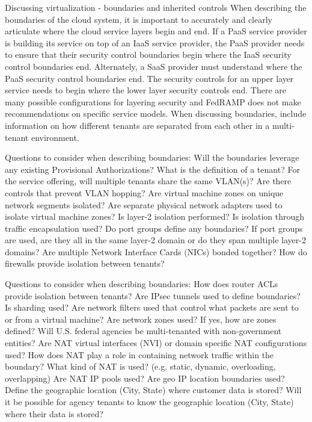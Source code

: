 \documentclass[../main.tex]{subfiles}
\begin{document}
Discussing virtualization - boundaries and inherited controls
When describing the boundaries of the cloud system, it is important to accurately and clearly articulate where the cloud service layers begin and end.
If a PaaS service provider is building its service on top of an IaaS service provider, the PaaS provider needs to ensure that their security control boundaries begin where the IaaS security control boundaries end. Alternately, a SaaS provider must understand where the PaaS security control boundaries end.
The security controls for an upper layer service needs to begin where the lower layer security controls end.
There are many possible configurations for layering security and FedRAMP does not make recommendations on specific service models.
When discussing boundaries, include information on how different tenants are separated from each other in a multi-tenant environment.


Questions to consider when describing boundaries:
Will the boundaries leverage any existing Provisional Authorizations?
What is the definition of a tenant?
For the service offering, will multiple tenants share the same VLAN(s)?
Are there controls that prevent VLAN hopping?
Are virtual machine zones on unique network segments isolated?
Are separate physical network adapters used to isolate virtual machine zones?
Is layer-2 isolation performed?
Is isolation through traffic encapsulation used?
Do port groups define any boundaries?
If port groups are used, are they all in the same layer-2 domain or do they span multiple
layer-2 domains?
Are multiple Network Interface Cards (NICs) bonded together?
How do firewalls provide isolation between tenants?

Questions to consider when describing boundaries:
How does router ACLs provide isolation between tenants?
Are IPsec tunnels used to define boundaries?
Is sharding used?
Are network filters used that control what packets are sent to or from a virtual machine?
Are network zones used? If yes, how are zones defined?
Will U.S. federal agencies be multi-tenanted with non-government entities?
Are NAT virtual interfaces (NVI) or domain specific NAT configurations used?
How does NAT play a role in containing network traffic within the boundary?
What kind of NAT is used? (e.g. static, dynamic, overloading, overlapping)
Are NAT IP pools used?
Are geo IP location boundaries used?
Define the geographic location (City, State) where customer data is stored?
Will it be possible for agency tenants to know the geographic location (City, State) where
their data is stored?
\end{document}
